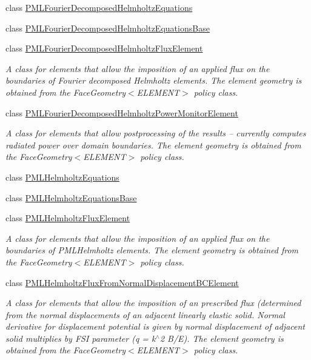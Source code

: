 \begin{DoxyCompactItemize}
class \hyperlink{classoomph_1_1PMLFourierDecomposedHelmholtzEquations}{P\+M\+L\+Fourier\+Decomposed\+Helmholtz\+Equations}
\item 
class \hyperlink{classoomph_1_1PMLFourierDecomposedHelmholtzEquationsBase}{P\+M\+L\+Fourier\+Decomposed\+Helmholtz\+Equations\+Base}
\item 
class \hyperlink{classoomph_1_1PMLFourierDecomposedHelmholtzFluxElement}{P\+M\+L\+Fourier\+Decomposed\+Helmholtz\+Flux\+Element}
\begin{DoxyCompactList}\small\item\em A class for elements that allow the imposition of an applied flux on the boundaries of Fourier decomposed Helmholtz elements. The element geometry is obtained from the Face\+Geometry$<$\+E\+L\+E\+M\+E\+N\+T$>$ policy class. \end{DoxyCompactList}\item 
class \hyperlink{classoomph_1_1PMLFourierDecomposedHelmholtzPowerMonitorElement}{P\+M\+L\+Fourier\+Decomposed\+Helmholtz\+Power\+Monitor\+Element}
\begin{DoxyCompactList}\small\item\em A class for elements that allow postprocessing of the results -- currently computes radiated power over domain boundaries. The element geometry is obtained from the Face\+Geometry$<$\+E\+L\+E\+M\+E\+N\+T$>$ policy class. \end{DoxyCompactList}\item 
class \hyperlink{classoomph_1_1PMLHelmholtzEquations}{P\+M\+L\+Helmholtz\+Equations}
\item 
class \hyperlink{classoomph_1_1PMLHelmholtzEquationsBase}{P\+M\+L\+Helmholtz\+Equations\+Base}
\item 
class \hyperlink{classoomph_1_1PMLHelmholtzFluxElement}{P\+M\+L\+Helmholtz\+Flux\+Element}
\begin{DoxyCompactList}\small\item\em A class for elements that allow the imposition of an applied flux on the boundaries of P\+M\+L\+Helmholtz elements. The element geometry is obtained from the Face\+Geometry$<$\+E\+L\+E\+M\+E\+N\+T$>$ policy class. \end{DoxyCompactList}\item 
class \hyperlink{classoomph_1_1PMLHelmholtzFluxFromNormalDisplacementBCElement}{P\+M\+L\+Helmholtz\+Flux\+From\+Normal\+Displacement\+B\+C\+Element}
\begin{DoxyCompactList}\small\item\em A class for elements that allow the imposition of an prescribed flux (determined from the normal displacements of an adjacent linearly elastic solid. Normal derivative for displacement potential is given by normal displacement of adjacent solid multiplies by F\+SI parameter (q = k$^\wedge$2 B/E). The element geometry is obtained from the Face\+Geometry$<$\+E\+L\+E\+M\+E\+N\+T$>$ policy class. \end{DoxyCompactList}\item 

\end{DoxyCompactItemize}
